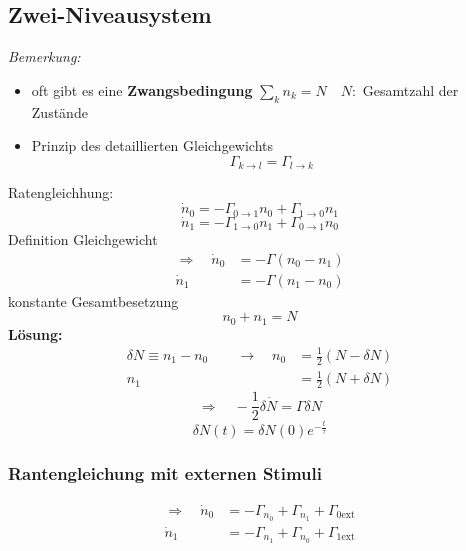 \documentclass[titlepage,11pt,a4paper,ngerman]{report}
\newcommand{\tx}[1]{\textrm{#1}}
\begin{document}
\subsection{Zwei-Niveausystem}

%
\emph{Bemerkung:}
\begin{itemize}
	\item oft gibt es eine \textbf{Zwangsbedingung} $ \sum_k n_k = N \quad N : $ Gesamtzahl der Zustände
	\item Prinzip des detaillierten Gleichgewichts
	\begin{equation*}
	\Gamma_{k \to l} = \Gamma_{l \to k}
	\end{equation*}
\end{itemize}
Ratengleichhung:
\begin{equation*}
\dot{n}_0 = - \Gamma_{0 \to 1} n_0 + \Gamma_{1 \to 0} n_1
\end{equation*}
\begin{equation*}
\dot{n}_1 = - \Gamma_{1 \to 0} n_1 + \Gamma_{0 \to 1} n_0
\end{equation*}
Definition Gleichgewicht
\begin{align*}
\Rightarrow \quad \dot{n}_0 &= - \Gamma(n_0 - n_1) \\
\dot{n}_1 &= - \Gamma (n_1 - n_0)
\end{align*}
konstante Gesamtbesetzung
\begin{equation*}
n_0 + n_1 = N
\end{equation*}
\textbf{Lösung:}
\begin{align*}
\delta N \equiv n_1 - n_0 \qquad \rightarrow \quad n_0 &= \frac{1}{2} (N - \delta N) \\
n_1 &= \frac{1}{2} (N + \delta N)
\end{align*}
\begin{equation*}
\Rightarrow \quad - \frac{1}{2} \delta \dot{N} = \Gamma \delta N
\end{equation*}
\begin{equation*}
\delta N(t) = \delta N(0) e^{-\frac{t}{\tau}}
\end{equation*}

\subsubsection{Rantengleichung mit externen Stimuli}


\begin{align*}
\Rightarrow \quad \dot{n}_0 &= - \Gamma_{n_0} + \Gamma_{n_1} + \Gamma_{0 \tx{ext}}\\
\dot{n}_1 &= - \Gamma_{n_1} + \Gamma_{n_0} + \Gamma_{1 \tx{ext}}
\end{align*}
\end{document}
